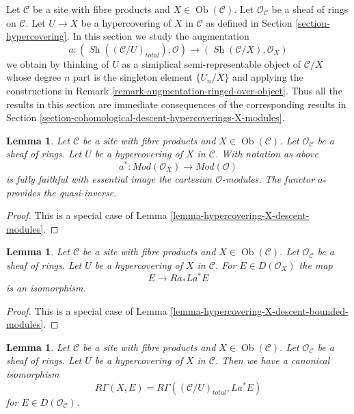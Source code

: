 \documentclass{stacks-project}
\theoremstyle{plain}
\newtheorem{lemma}[subsection]{Lemma}
\theoremstyle{definition}
\theoremstyle{remark}
\numberwithin{equation}{subsection}
\def\Ob{\mathop{\mathrm{Ob}}\nolimits}
\def\Sh{\mathop{\mathit{Sh}}\nolimits}
\begin{document}
\noindent
Let $\mathcal{C}$ be a site with fibre products and $X \in \Ob(\mathcal{C})$.
Let $\mathcal{O}_\mathcal{C}$ be a sheaf of rings on $\mathcal{C}$.
Let $U \to X$ be a hypercovering of $X$ in $\mathcal{C}$ as defined
in Section \ref{section-hypercovering}. In this section we study the
augmentation
$$
a :
(\Sh((\mathcal{C}/U)_{total}), \mathcal{O})
\longrightarrow
(\Sh(\mathcal{C}/X), \mathcal{O}_X)
$$
we obtain by thinking of $U$ as a simiplical semi-representable
object of $\mathcal{C}/X$ whose degree $n$ part is the singleton
element $\{U_n/X\}$ and applying the constructions in
Remark \ref{remark-augmentation-ringed-over-object}.
Thus all the results in this section are immediate consequences
of the corresponding results in
Section \ref{section-cohomological-descent-hypercoverings-X-modules}.

\begin{lemma}
\label{lemma-hypercovering-X-simple-descent-modules}
Let $\mathcal{C}$ be a site with fibre products and $X \in \Ob(\mathcal{C})$.
Let $\mathcal{O}_\mathcal{C}$ be a sheaf of rings.
Let $U$ be a hypercovering of $X$ in $\mathcal{C}$. With notation as above
$$
a^* : \textit{Mod}(\mathcal{O}_X) \to \textit{Mod}(\mathcal{O})
$$
is fully faithful with essential image the cartesian $\mathcal{O}$-modules.
The functor $a_*$ provides the quasi-inverse.
\end{lemma}

\begin{proof}
This is a special case of
Lemma \ref{lemma-hypercovering-X-descent-modules}.
\end{proof}

\begin{lemma}
\label{lemma-hypercovering-X-simple-descent-bounded-modules}
Let $\mathcal{C}$ be a site with fibre products and $X \in \Ob(\mathcal{C})$.
Let $\mathcal{O}_\mathcal{C}$ be a sheaf of rings.
Let $U$ be a hypercovering of $X$ in $\mathcal{C}$. For
$E \in D(\mathcal{O}_X)$ the map
$$
E \longrightarrow Ra_*La^*E
$$
is an isomorphism.
\end{lemma}

\begin{proof}
This is a special case of
Lemma \ref{lemma-hypercovering-X-descent-bounded-modules}.
\end{proof}

\begin{lemma}
\label{lemma-compare-cohomology-hypercovering-X-simple-modules}
Let $\mathcal{C}$ be a site with fibre products and $X \in \Ob(\mathcal{C})$.
Let $\mathcal{O}_\mathcal{C}$ be a sheaf of rings.
Let $U$ be a hypercovering of $X$ in $\mathcal{C}$.
Then we have a canonical isomorphism
$$
R\Gamma(X, E) = R\Gamma((\mathcal{C}/U)_{total}, La^*E)
$$
for $E \in D(\mathcal{O}_\mathcal{C})$.
\end{lemma}
\end{document}
